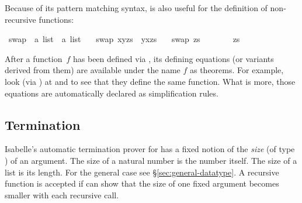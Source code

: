\begin{isabellebody}
\begin{isamarkuptext}
Because of its pattern matching syntax,  is also useful
for the definition of non-recursive functions:%
\end{isamarkuptext}%
\isamarkuptrue%
\isamarkupfalse%
\ swap{}{}\ {\isacharcolon}{\isacharcolon}\ {\isachardoublequoteopen}{\isacharprime}a\ list\ {\isasymRightarrow}\ {\isacharprime}a\ list{\isachardoublequoteclose}\ \isanewline
\ \ {\isachardoublequoteopen}swap{}{}\ {\isacharparenleft}x{\isacharhash}y{\isacharhash}zs{\isacharparenright}\ {\isacharequal}\ y{\isacharhash}x{\isacharhash}zs{\isachardoublequoteclose}\ {\isacharbar}\isanewline
\ \ {\isachardoublequoteopen}swap{}{}\ zs\ \ \ \ \ \ \ {\isacharequal}\ zs{\isachardoublequoteclose}%
\begin{isamarkuptext}%
After a function~$f$ has been defined via ,
its defining equations (or variants derived from them) are available
under the name $f$ as theorems.
For example, look (via ) at
 and  to see that they define
the same function. What is more, those equations are automatically declared as
simplification rules.

\subsection{Termination}

Isabelle's automatic termination prover for  has a
fixed notion of the \emph{size} (of type ) of an
argument. The size of a natural number is the number itself. The size
of a list is its length. For the general case see \S\ref{sec:general-datatype}.
A recursive function is accepted if  can
show that the size of one fixed argument becomes smaller with each
recursive call.


\end{isamarkuptext}
\end{isabellebody}
